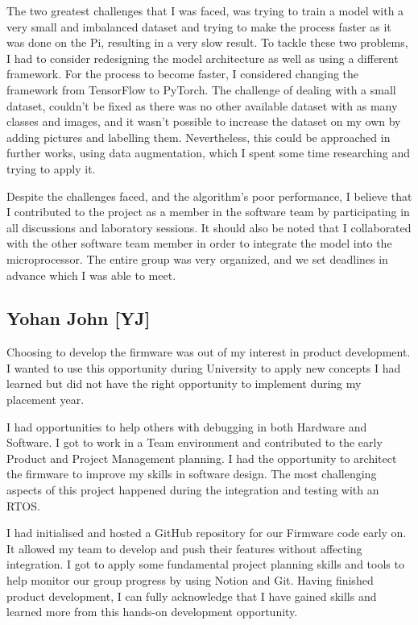 The two greatest challenges that I was faced, was trying to train a model with a very small and imbalanced dataset and trying to make the process faster as it was done on the Pi, resulting in a very slow result.
To tackle these two problems, I had to consider redesigning the model architecture as well as using a different framework.
For the process to become faster, I considered changing the framework from TensorFlow to PyTorch.
The challenge of dealing with a small dataset, couldn't be fixed as there was no other available dataset with as many classes and images, and it wasn't possible to increase the dataset on my own by adding pictures and labelling them.
Nevertheless, this could be approached in further works, using data augmentation, which I spent some time researching and trying to apply it.

Despite the challenges faced, and the algorithm's poor performance, I believe that I contributed to the project as a member in the software team by participating in all discussions and laboratory sessions.
It should also be noted that I collaborated with the other software team member in order to integrate the model into the microprocessor.
The entire group was very organized, and we set deadlines in advance which I was able to meet.


\subsection{Yohan John [YJ]}
Choosing to develop the firmware was out of my interest in product development.
I wanted to use this opportunity during University to apply new concepts I had learned but did not have the right opportunity to implement during my placement year.

I had opportunities to help others with debugging in both Hardware and Software.
I got to work in a Team environment and contributed to the early Product and Project Management planning.
I had the opportunity to architect the firmware to improve my skills in software design.
The most challenging aspects of this project happened during the integration and testing with an RTOS.

I had initialised and hosted a GitHub repository for our Firmware code early on.
It allowed my team to develop and push their features without affecting integration.
I got to apply some fundamental project planning skills and tools to help monitor our group progress by using Notion and Git.
Having finished product development, I can fully acknowledge that I have gained skills and learned more from this hands-on development opportunity.


